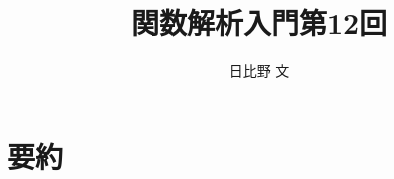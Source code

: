\documentclass[12pt,a4paper]{ltjsarticle}
\begin{document}
\title{関数解析入門第12回}
\author{日比野 文}
\maketitle

\section{要約}
\end{document}

